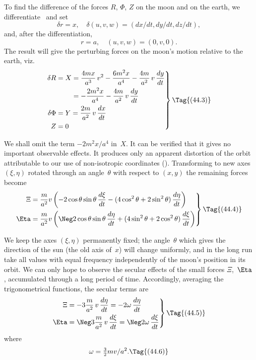 \documentclass[12pt]{book}
\begin{document}
To find the difference of the forces $R$, $\Phi$, $Z$ on the moon and on the earth,
we differentiate~ and set
\[
\delta r = x,\quad
\delta(u, v, w) = (dx/dt, dy/dt, dz/dt),
\]
and, after the differentiation,
\[
r = a,\quad
(u, v, w) = (0, v, 0).
\]
The result will give the perturbing forces on the moon's motion relative to
the earth, viz.\
\[
\left.
\begin{aligned}
  \delta R
  &= \begin{aligned}[t]
    X &= \frac{4mx}{a^{3}}\, v^2 - \frac{6m^{2}x}{a^{4}} - \frac{4m}{a^2}\, v\, \frac{dy}{dt} \\
    &= -\frac{2m^{2}x}{a^{4}} - \frac{4m}{a^2}\, v\, \frac{dy}{dt}
  \end{aligned} \\
  \delta\Phi &= Y = \frac{2m}{a^2}\, v\, \frac{dx}{dt}\\
  Z &= 0
\end{aligned}
\right\}
\Tag{(44.3)}
\]

We shall omit the term $-2m^{2}x/a^{4}$ in~$X$. It can be verified that it gives
no important observable effects. It produces only an apparent distortion of
the orbit attributable to our use of non\hyp{}isotropic coordinates (). Transforming
to new axes $(\xi, \eta)$ rotated through an angle~$\theta$ with respect to $(x, y)$
the remaining forces become
\[
\left.
\begin{aligned}
  \Xi &= \frac{m}{a^2} v \left(-2\cos\theta \sin\theta\, \frac{d\xi}{dt} - (4\cos^{2}\theta + 2\sin^{2}\theta)\, \frac{d\eta}{dt}\right)\\
  \Eta &= \frac{m}{a^2} v \left(\Neg2\cos\theta \sin\theta\, \frac{d\eta}{dt} + (4\sin^{2}\theta + 2\cos^{2}\theta)\, \frac{d\xi}{dt}\right)
\end{aligned}
\right\}
\Tag{(44.4)}
\]

We keep the axes $(\xi, \eta)$ permanently fixed; the angle~$\theta$ which gives the
direction of the sun (the old axis of~$x$) will change uniformly, and in the long
run take all values with equal frequency independently of the moon's position
in its orbit. We can only hope to observe the secular effects of the small forces
$\Xi$,~$\Eta$, accumulated through a long period of time. Accordingly, averaging the
trigonometrical functions, the secular terms are
\[
\left.
\begin{aligned}
  \Xi &= -3\frac{m}{a^2}\, v\, \frac{d\eta}{dt}
  = -2\omega\, \frac{d\eta}{dt}\\
  \Eta &= \Neg 3\frac{m}{a^2}\, v\, \frac{d\xi}{dt}
  = \Neg2\omega\, \frac{d\xi}{dt}
\end{aligned}
\right\}
\Tag{(44.5)}
\]
where
\[
\omega = \tfrac{3}{2}mv/a^2.
\Tag{(44.6)}
\]
\end{document}
